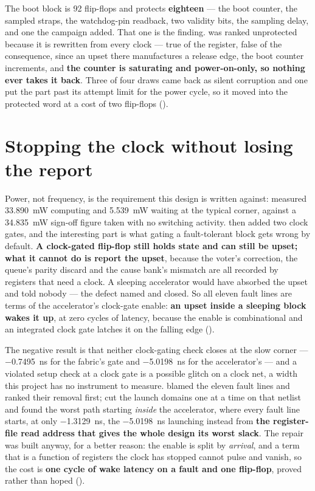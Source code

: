 The boot block is 92 flip-flops and  protects \textbf{eighteen}
--- the boot counter, the sampled straps, the watchdog-pin readback, two
validity bits, the sampling delay, and one the campaign added. That one
is the finding.  was ranked unprotected because it is
rewritten from  every clock --- true of the register,
false of the consequence, since an upset there manufactures a release
edge, the boot counter increments, and \textbf{the counter is saturating
and power-on-only, so nothing ever takes it back}. Three of four draws
came back as silent corruption and one put the part past its attempt
limit for the power cycle, so it moved into the protected word at a cost
of two flip-flops ().

\section{Stopping the clock without losing the report}
\label{sec:harden-clock}

Power, not frequency, is the requirement this design is written against:
 measured \SI{33.890}{\milli\watt} computing and
\SI{5.539}{\milli\watt} waiting at the typical corner, against a
\SI{34.835}{\milli\watt} sign-off figure taken with no switching
activity.  then added two clock gates, and the interesting
part is what gating a fault-tolerant block gets wrong by default. \textbf{A
clock-gated flip-flop still holds state and can still be upset; what it
cannot do is report the upset}, because the voter's correction, the
queue's parity discard and the cause bank's mismatch are all recorded by
registers that need a clock. A sleeping accelerator would have absorbed
the upset and told nobody --- the defect  named
and  closed. So all eleven fault lines are terms of the
accelerator's clock-gate enable: \textbf{an upset inside a sleeping
block wakes it up}, at zero cycles of latency, because the enable is
combinational and an integrated clock gate latches it on the falling
edge ().

The negative result is that neither clock-gating check closes at the
slow corner --- \SI{-0.7495}{\nano\second} for the fabric's gate and
\SI{-5.0198}{\nano\second} for the accelerator's --- and a violated
setup check at a clock gate is a possible glitch on a clock net, a width
this project has no instrument to measure.  blamed the eleven
fault lines and ranked their removal first;  cut the launch
domains one at a time on that netlist and found the worst path starting
\emph{inside} the accelerator, where every fault line starts, at only
\SI{-1.3129}{\nano\second}, the \SI{-5.0198}{\nano\second} launching
instead from \textbf{the register-file read address that gives the whole
design its worst slack}. The repair was built anyway, for a better
reason: the enable is split by \emph{arrival}, and a term that is a
function of registers the clock has stopped cannot pulse and vanish, so
the cost is \textbf{one cycle of wake latency on a fault and one
flip-flop}, proved rather than hoped ().

